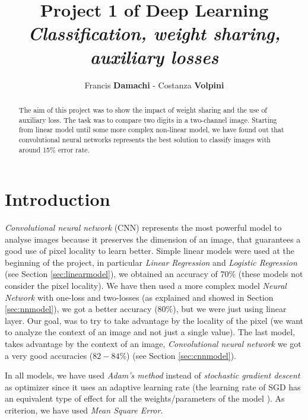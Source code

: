 \documentclass[journal, a4paper]{IEEEtran}
\begin{document}
	\title{Project 1 of Deep Learning\\ \textit{\Large{Classification, weight sharing, auxiliary losses}}}
	\author{Francis \textbf{Damachi} - Costanza \textbf{Volpini}}
	\maketitle
	
\begin{abstract}
The aim of this project was to show the impact of weight sharing and the use of auxiliary loss. The task was to compare two digits in a two-channel image. Starting from linear model until some more complex non-linear model, we have found out that convolutional neural networks represents the best solution to classify images with  around 15\% error rate.
\end{abstract}

\section{Introduction}
\label{sec:intro}
\textit{Convolutional neural network} (CNN) represents the most powerful model to analyse images because it preserves the dimension of an image, that guarantees a good use of pixel locality to learn better.
Simple linear models were used at the beginning of the project, in particular \textit{Linear Regression} and \textit{Logistic Regression} (see Section \ref{sec:linearmodel}), we obtained an accuracy of $70\%$ (these models not consider the pixel locality). We have then used a more complex model \textit{Neural Network} with one-loss and two-losses (as explained and showed in Section \ref{sec:nnmodel}), we got a better accuracy ($80\%$), but we were just using linear layer. Our goal, was to try to take advantage by the locality of the pixel (we want to analyze the context of an image and not just a single value). The last model, takes advantage by the context of an image, \textit{Convolutional neural network} we got a very good accuracies ($82-84\%$)  (see Section \ref{sec:cnnmodel}).

In all models, we have used \textit{Adam's method} instead of \textit{stochastic gradient descent} as optimizer since it uses an adaptive learning rate (the learning rate of SGD has an equivalent type of effect for all the weights/parameters of the model \cite{reference0}).
As criterion, we have used \textit{Mean Square Error}.
\end{document}
